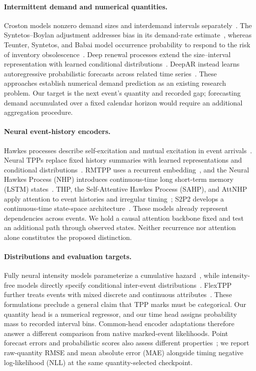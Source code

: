 \documentclass[runningheads]{llncs}
\begin{document}
\paragraph{Intermittent demand and numerical quantities.}
Croston models nonzero demand sizes and interdemand intervals separately~\cite{croston1972forecasting}. The Syntetos--Boylan adjustment addresses bias in its demand-rate estimate~\cite{syntetos2005accuracy}, whereas Teunter, Syntetos, and Babai model occurrence probability to respond to the risk of inventory obsolescence~\cite{teunter2011obsolescence}. Deep renewal processes extend the size--interval representation with learned conditional distributions~\cite{turkmen2021renewal}. DeepAR instead learns autoregressive probabilistic forecasts across related time series~\cite{salinas2020deepar}. These approaches establish numerical demand prediction as an existing research problem. Our target is the next event's quantity and recorded gap; forecasting demand accumulated over a fixed calendar horizon would require an additional aggregation procedure.

\paragraph{Neural event-history encoders.}
Hawkes processes describe self-excitation and mutual excitation in event arrivals~\cite{hawkes1971spectra}. Neural TPPs replace fixed history summaries with learned representations and conditional distributions~\cite{shchur2021review}. RMTPP uses a recurrent embedding~\cite{du2016rmtpp}, and the Neural Hawkes Process (NHP) introduces continuous-time long short-term memory (LSTM) states~\cite{mei2017nhp}. THP, the Self-Attentive Hawkes Process (SAHP), and AttNHP apply attention to event histories and irregular timing~\cite{zuo2020thp,zhang2020sahp,yang2022anhp}; S2P2 develops a continuous-time state-space architecture~\cite{chang2025s2p2}. These models already represent dependencies across events. We hold a causal attention backbone fixed and test an additional path through observed states. Neither recurrence nor attention alone constitutes the proposed distinction.

\paragraph{Distributions and evaluation targets.}
Fully neural intensity models parameterize a cumulative hazard~\cite{omi2019fully}, while intensity-free models directly specify conditional inter-event distributions~\cite{shchur2020intensityfree}. FlexTPP further treats events with mixed discrete and continuous attributes~\cite{draxler2025flextpp}. These formulations preclude a general claim that TPP marks must be categorical. Our quantity head is a numerical regressor, and our time head assigns probability mass to recorded interval bins. Common-head encoder adaptations therefore answer a different comparison from native marked-event likelihoods. Point forecast errors and probabilistic scores also assess different properties~\cite{hyndman2006accuracy,gneiting2007proper}; we report raw-quantity RMSE and mean absolute error (MAE) alongside timing negative log-likelihood (NLL) at the same quantity-selected checkpoint.
\end{document}
